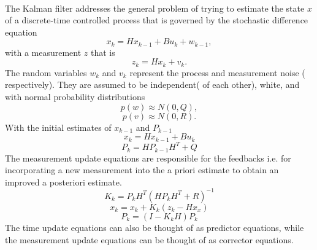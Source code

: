 \documentclass[a4paper,10pt]{report}
\begin{document}
\paragraph*{}
The Kalman filter addresses the general problem of trying to estimate the state $x$ of a discrete-time controlled process that is
governed by the stochastic difference equation
\begin{equation}
 x_k = Hx_{k-1} + Bu_k + w_{k-1} ,
\end{equation}
with a measurement $z$ that is
\begin{equation}
 z_k = Hx_k + v_k.
\end{equation}
The random variables $w_k$ and $v_k$ represent the process and measurement noise ( respectively). They are assumed to be independent( of each other), white, and with normal probability distributions
\begin{equation}
 p(w) \approx N(0,Q),
\end{equation}
\begin{equation}
 p(v) \approx N(0,R).
\end{equation}
With the initial estimates of $x_{k-1}$ and $P_{k-1}$
\begin{equation}
x_k = Hx_{k-1} + Bu_k
\end{equation}
\begin{equation}
P_k = HP_{k-1}H^T + Q
\end{equation}
The measurement update equations are responsible for the feedbacks i.e. for incorporating a new measurement into the a priori estimate
to obtain an improved a posteriori estimate.
\begin{equation}
K_k = P_kH^T(HP_kH^T + R)^{-1} \label{kalmangain}
\end{equation}
\begin{equation}
x_k = x_k + K_k(z_k - Hx_x)
\end{equation}
\begin{equation}
P_k = (I-K_kH)P_k
\end{equation}
The time update equations can also be thought of as predictor equations, while the measurement update equations can be thought of as corrector equations.
\end{document}
